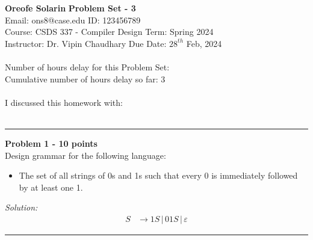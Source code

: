 \documentclass[a4paper, 11pt]{article}
\newenvironment{problem}[2][Problem]
    { \begin{mdframed}[backgroundcolor=gray!20] \textbf{#1 #2} \\}
    {  \end{mdframed}}
\newenvironment{solution}
    {\textit{Solution:}}
    {}
\begin{document}
\noindent
\large\textbf{Oreofe Solarin} \hfill \textbf{Problem Set - 3}   \\
Email: ons8@case.edu \hfill ID: 123456789 \\
\normalsize Course: CSDS 337 - Compiler Design \hfill Term: Spring 2024\\
Instructor: Dr. Vipin Chaudhary \hfill Due Date: $28^{th}$ Feb, 2024 \\ \\
Number of hours delay for this Problem Set: \hfill\\
Cumulative number of hours delay so far: \hfill 3 \\ \\
I discussed this homework with: \hfill  \\ \\

\noindent\rule{7in}{2.8pt}
\begin{problem}{1 - 10 points}
Design grammar for the following language:

\begin{itemize}
    \item The set of all strings of 0s and 1s such that every 0 is immediately followed by at least one 1.
\end{itemize}

\end{problem}
\begin{solution}
\begin{align*}
S & \rightarrow 1S \,|\, 01S \,|\, \varepsilon
\end{align*}
\end{solution} 
\noindent\rule{7in}{2.8pt}

\end{document}
